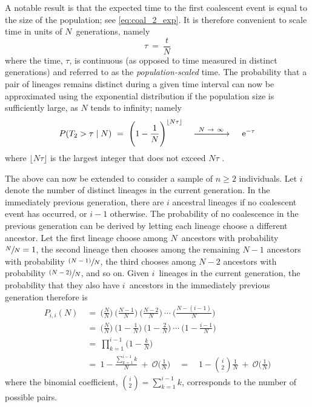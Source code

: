 A notable result is that the expected time to the first coalescent event is equal to the size of the population; see \cref{eq:coal_2_exp}.
It is therefore convenient to scale time in units of $N$~generations, namely
\begin{equation}\label{eq:timescale}
	\tau ~=~ \frac{t}{N}
\end{equation}
where the time, $\tau$, is continuous (as opposed to time measured in distinct generations) and referred to as the \emph{population-scaled} time.
The probability that a pair of lineages remains distinct during a given time interval can now be approximated using the exponential distribution if the population size is sufficiently large, \ie as $N$ tends to infinity; namely
\begin{equation}\label{eq:coal_2_dont}
	P(T_2 > \tau \mid N)
	~=~ \Bigg( 1 - \frac{1}{N} \Bigg)^{\lfloor N \tau \rfloor}
	\quad \xrightarrow{~ N~\rightarrow~\infty ~} \quad
	\,\mathrm{e}^{-\tau}
\end{equation}
where ${\lfloor N \tau \rfloor}$ is the largest integer that does not exceed ${N \tau}$ \citep[\eg, see][]{nordborg2001coalescent}.


The above can now be extended to consider a sample of ${n\geq2}$ individuals.
Let $i$ denote the number of distinct lineages in the current generation.
In the immediately previous generation, there are $i$ ancestral lineages if no coalescent event has occurred, or ${i-1}$ otherwise.
The probability of no coalescence in the previous generation can be derived by letting each lineage choose a different ancestor.
Let the first lineage choose among $N$~ancestors with probability ${\sfrac{N}{N} = 1}$, the second lineage then chooses among the remaining ${N-1}$ ancestors with probability ${\sfrac{(N-1)}{N}}$, the third chooses among ${N-2}$ ancestors with probability ${\sfrac{(N-2)}{N}}$, and so on.
Given $i$~lineages in the current generation, the probability that they also have $i$~ancestors in the immediately previous generation therefore is
\begin{equation}\label{eq:coal_n_dont}
\begin{split}
  P_{i,i}(N)
  & ~=~ \Big(\frac{N}{N}\Big) ~ \Big(\frac{N-1}{N}\Big) ~ \Big(\frac{N-2}{N}\Big) ~ \cdots ~ \Big(\frac{N-(i-1)}{N}\Big) \\
  & ~=~ \Big(\frac{N}{N}\Big) ~ \Big(1-\frac{1}{N}\Big) ~ \Big(1-\frac{2}{N}\Big) ~ \cdots ~ \Big(1-\frac{i-1}{N}\Big) \\
	& ~=~ \prod_{k=1}^{i-1} \Big( 1 - \frac{k}{N} \Big) \\
  & ~=~ 1-\frac{{\sum_{k=1}^{i-1}k}}{N} ~+~ \mathcal{O}\Big( \frac{1}{N} \Big)
	\quad = \quad 1 - {i \choose 2} \frac{1}{N} ~+~ \mathcal{O}\Big( \frac{1}{N} \Big)
\end{split}
\end{equation}
where the binomial coefficient, ${{i \choose 2} = \sum_{k=1}^{i-1}k}$, corresponds to the number of possible pairs.

